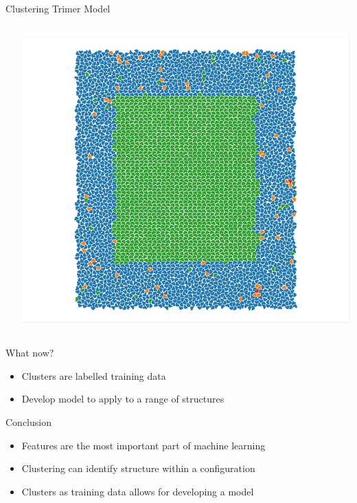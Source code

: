 \documentclass[aspectratio=169, 14pt]{beamer}
\begin{document}
\begin{frame}{Clustering Trimer Model}
\begin{columns}
\begin{column}{0.33\textwidth}
    \end{column}
    \begin{column}{0.33\textwidth}
      \includegraphics[width=\textwidth]{clustering_results_pg.png}
    \end{column}
  \end{columns}
\end{frame}

\begin{frame}{What now?}

  \begin{itemize}
    \item Clusters are labelled training data
    \item Develop model to apply to a range of structures
  \end{itemize}

\end{frame}


\begin{frame}{Conclusion}

  \begin{itemize}
    \item Features are the most important part of machine learning
    \item Clustering can identify structure within a configuration
    \item Clusters as training data allows for developing a model
  \end{itemize}

\end{frame}
\end{document}
